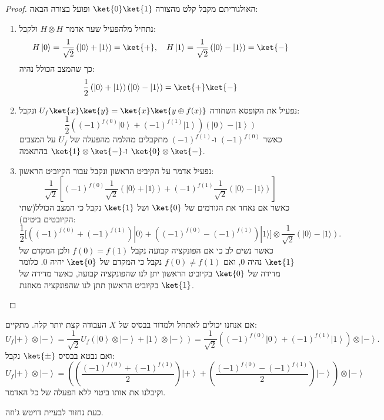 \documentclass{tstextbook}
\begin{document}
\begin{proof}
האולגוריתם מקבל קלט מהצורה \(\ket{0}\ket{1}\) ופועל בצורה הבאה:

  \begin{enumerate}
    \item נתחיל מלהפעיל שער אדמר \(H\otimes H\) ולקבל: 
$$H\left|0\right\rangle=\frac{1}{\sqrt{2}}\left( \left|0\right\rangle+\left|1\right\rangle \right)=\ket{+} ,\quad H\left|1\right\rangle=\frac{1}{\sqrt{2}}\left( \left|0\right\rangle-\left|1\right\rangle \right)=\ket{-} $$
כך שהמצב הכולל נהיה:
$${\frac{1}{2}}\left( |0\rangle+|1\rangle \right)\left( |0\rangle-|1\rangle \right)=\ket{+} \ket{-} $$


    \item נפעיל את הקופסא השחורה \(U_{f}\ket{x}\ket{y}=\ket{x}\ket{y\oplus f(x)}\) ונקבל: 
$$\frac{1}{2}\left((-1)^{f(0)}\left|0\right\rangle+(-1)^{f(1)}\left|1\right\rangle\right)\left(\left|0\right\rangle-\left|1\right\rangle\right)$$
כאשר \((-1)^{f(0)}\) ו-\((-1)^{f(1)}\) מתקבלים מהלמה מהפעלה של \(U_{f}\) על המצבים \(\ket{0}\otimes \ket{-}\) ו-\(\ket{1}\otimes \ket{ -}\) בהתאמה.


    \item נפעיל אדמר על הקיביט הראשון ונקבל עבור הקיוביט הראשון: 
$${\frac{1}{\sqrt{2}}}\left[(-1)^{f(0)}{\frac{1}{\sqrt{2}}}(|0\rangle+|1\rangle)+(-1)^{f(1)}{\frac{1}{\sqrt{2}}}(|0\rangle-|1\rangle)\right]$$
כאשר אם נאחד את הגורמים של \(\ket{0}\) ושל \(\ket{1}\) נקבל כי המצב הכולל(שתי הקיובטים ביטים):
$${\frac{1}{2}}\Bigg[\left((-1)^{f(0)}+(-1)^{f(1)}\right)|0\rangle+\left((-1)^{f(0)}-(-1)^{f(1)}\right)|1\rangle\Bigg]\otimes{\frac{1}{\sqrt{2}}}(|0\rangle-|1\rangle).$$
כאשר נשים לב כי אם הפונקציה קבועה נקבל \(f(0)=f(1)\) ולכן המקדם של \(\ket{1}\) נהיה 0, ואם \(f(0)\neq f(1)\) נקבל כי המקדם של \(\ket{0}\) יהיה 0.
כלומר מדידה של \(\ket{0}\) בקיוביט הראשון יתן לנו שהפונקציה קבועה, כאשר מדידה של \(\ket{1}\) בקיוביט הראשון תתן לנו שהפונקציה מאוזנת.


  \end{enumerate}
\end{proof}
\begin{remark}
אם אנחנו יכולים לאתחל ולמדוד בבסיס של \(X\) העבודה קצת יותר קלה. מתקיים:
$$U_{f}\left|+\right\rangle\otimes\left|-\right\rangle=\frac{1}{\sqrt{2}}U_{f}\left(\left|0\right\rangle\otimes\left|-\right\rangle+\left|1\right\rangle\otimes\left|-\right\rangle\right)=\frac{1}{\sqrt{2}}\left((-1)^{f(0)}\left|0\right\rangle+(-1)^{f(1)}\left|1\right\rangle\right)\otimes\left|-\right\rangle.$$
ואם נבטא בבסיס \(\ket{\pm}\) נקבל:
$$U_{f}\left|+\right\rangle\otimes\left|-\right\rangle=\left(\left(\frac{(-1)^{f(0)}+(-1)^{f(1)}}{2}\right)\left|+\right\rangle+\left(\frac{(-1)^{f(0)}-(-1)^{f(1)}}{2}\right)\left|-\right\rangle\right)\otimes\left|-\right\rangle$$
וקיבלנו את אותו ביטוי ללא הפעלה של כל האדמר.

\end{remark}
כעת נחזור לבעיית דויטש ג'וזה.
\end{document}
